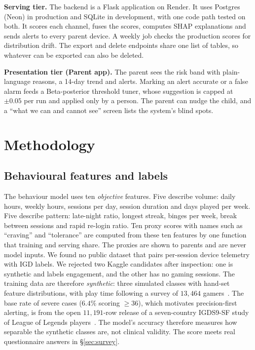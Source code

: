 \documentclass[conference]{IEEEtran}
\begin{document}
\textbf{Serving tier.} The backend is a Flask application on Render. It uses Postgres
(Neon) in production and SQLite in development, with one code path tested on both. It
scores each channel, fuses the scores, computes SHAP explanations and sends alerts to
every parent device. A weekly job checks the production scores for distribution drift.
The export and delete endpoints share one list of tables, so whatever can be exported
can also be deleted.

\textbf{Presentation tier (Parent app).} The parent sees the risk band with
plain-language reasons, a 14-day trend and alerts. Marking an alert accurate or a false
alarm feeds a Beta-posterior threshold tuner, whose suggestion is capped at $\pm0.05$
per run and applied only by a person. The parent can nudge the child, and a ``what we
can and cannot see'' screen lists the system's blind spots.

\section{Methodology}
\subsection{Behavioural features and labels}
The behaviour model uses ten \emph{objective} features. Five describe volume: daily
hours, weekly hours, sessions per day, session duration and days played per week. Five
describe pattern: late-night ratio, longest streak, binges per week, break between
sessions and rapid re-login ratio. Ten proxy scores with names such as ``craving'' and
``tolerance'' are computed from these ten features by one function that training and
serving share. The proxies are shown to parents and are never model inputs. We found no
public dataset that pairs per-session device telemetry with IGD labels. We rejected two
Kaggle candidates after inspection: one is synthetic and labels engagement, and the
other has no gaming sessions. The training data are therefore \emph{synthetic}: three
simulated classes with hand-set feature distributions, with play time following a
survey of $13{,}464$ gamers~\cite{sauter2017}. The base rate of severe cases ($6.4\%$
scoring $\geq$$36$), which motivates precision-first alerting, is from the open
$11{,}191$-row release of a seven-country IGDS9-SF study of League of Legends
players~\cite{igdslatam2024}. The model's accuracy therefore measures how separable the
synthetic classes are, not clinical validity. The score meets real questionnaire
answers in \S\ref{sec:survey}.
\end{document}
